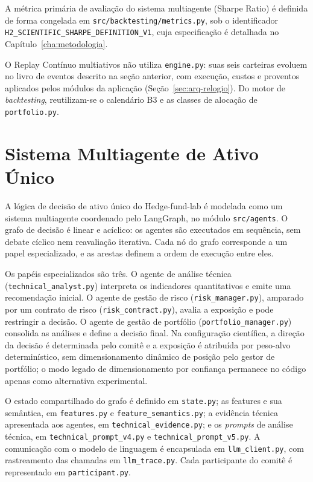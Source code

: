 \documentclass{eic-bcc-tcc}
\begin{document}
A métrica primária de avaliação do sistema multiagente (Sharpe Ratio) é definida de forma congelada em \texttt{src/backtesting/metrics.py}, sob o identificador \texttt{H2\_SCIENTIFIC\_SHARPE\_DEFINITION\_V1}, cuja especificação é detalhada no Capítulo~\ref{cha:metodologia}.

O Replay Contínuo multiativos não utiliza \texttt{engine.py}: suas seis carteiras evoluem no livro de eventos descrito na seção anterior, com execução, custos e proventos aplicados pelos módulos da aplicação (Seção~\ref{sec:arq-relogio}). Do motor de \textit{backtesting}, reutilizam-se o calendário B3 e as classes de alocação de \texttt{portfolio.py}.

\section{Sistema Multiagente de Ativo Único}
\label{sec:arq-ativo-unico}

A lógica de decisão de ativo único do Hedge-fund-lab é modelada como um sistema multiagente coordenado pelo LangGraph, no módulo \texttt{src/agents}. O grafo de decisão é linear e acíclico: os agentes são executados em sequência, sem debate cíclico nem reavaliação iterativa. Cada nó do grafo corresponde a um papel especializado, e as arestas definem a ordem de execução entre eles.

Os papéis especializados são três. O agente de análise técnica (\texttt{technical\_analyst.py}) interpreta os indicadores quantitativos e emite uma recomendação inicial. O agente de gestão de risco (\texttt{risk\_manager.py}), amparado por um contrato de risco (\texttt{risk\_contract.py}), avalia a exposição e pode restringir a decisão. O agente de gestão de portfólio (\texttt{portfolio\_manager.py}) consolida as análises e define a decisão final. Na configuração científica, a direção da decisão é determinada pelo comitê e a exposição é atribuída por peso-alvo determinístico, sem dimensionamento dinâmico de posição pelo gestor de portfólio; o modo legado de dimensionamento por confiança permanece no código apenas como alternativa experimental.

O estado compartilhado do grafo é definido em \texttt{state.py}; as features e sua semântica, em \texttt{features.py} e \texttt{feature\_semantics.py}; a evidência técnica apresentada aos agentes, em \texttt{technical\_evidence.py}; e os \textit{prompts} de análise técnica, em \texttt{technical\_prompt\_v4.py} e \texttt{technical\_prompt\_v5.py}. A comunicação com o modelo de linguagem é encapsulada em \texttt{llm\_client.py}, com rastreamento das chamadas em \texttt{llm\_trace.py}. Cada participante do comitê é representado em \texttt{participant.py}.
\end{document}

